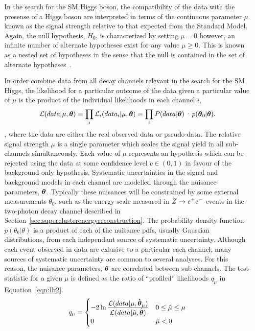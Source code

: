 In the search for the SM Higgs boson, the compatibility of the data
with the presense of a Higgs boson are interpreted in terms of the 
continuous parameter $\mu$ known as the signal strength relative to that expected
from the Standard Model. 
Again, the null hypothesis, $H_{0}$, is characterized by setting $\mu=0$ however,
an infinite number of alternate hypotheses exist for any value $\mu \ge 0$.
This is known as a nested set of hypotheses in the sense that the null 
is contained in the set of alternate hypotheses~\cite{null}.

In order combine data from all decay channels relevant in the search for the
SM Higgs, the likelihood for a particular outcome of the data given a particular
value of $\mu$ is the product of the individual likelihoods in each channel $i$,
\begin{equation}
\mathcal{L}(data|\mu,\boldth)= \prod_{i}\mathcal{L}_{i}(data_{i}|\mu,\boldth)
= \prod_{i}P(data|\boldth) \cdot p(\boldth_{0}|\boldth).
\end{equation},
where the data are either the real observed data or pseudo-data.
The relative signal strength $\mu$ is a single parameter which scales the signal
yield in all sub-channels simultaneously. 
Each value of $\mu$ represents an hypothesis which can be rejected using the data
at some confidence level $c\in(0,1)$ in favour of the background only hypothesis.
Systematic uncertainties in the signal and background models in each channel
are modelled through the nuisance parameters, ${\boldsymbol{\theta}}$. Typically these nuisances
will be constrained by some external measurements $\theta_{0}$, such as the energy scale
measured in $Z\rightarrow e^{+}e^{-}$ events in the two-photon decay channel described in 
Section~\ref{sec:superclusterenergyreconstruction}. 
The probability density function $p(\theta_{0}|\theta)$ is a product of each of the 
nuisance pdfs, usually Gaussian distributions, from each independant source of systematic
uncertainty.
Although each event observed in data are exlusive to a particular each channel, 
many sources of systematic uncertainty are common to several analyses. For this
reason, the nuisance parameters, ${\boldsymbol{\theta}}$ are correlated between sub-channels.
The test-statistic for a given $\mu$ is defined as the ratio 
of ``profiled'' likelihoods $q_{\mu}$ in Equation~\ref{eqn:llr2}.
\begin{equation}
q_{\mu} = 
	\begin {cases} 
	-2\ln\frac{\displaystyle \mathcal{L}(data | \mu,\hat{{\boldsymbol{\theta}}}_{\mu})}
	{\displaystyle \mathcal{L}(data | \hat{\mu},\hat{{\boldsymbol{\theta}}})} 
		&  0 \le \hat{\mu} \le \mu \\
	 0 	&  \hat{\mu} < 0
	\end{cases}
\label{eqn:llr2}
\end{equation}

